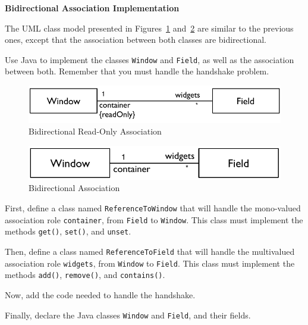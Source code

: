 \documentclass[a4paper,11pt]{memoir}
\newcommand{\code}[1]{\lstinline{#1}}
\begin{document}
\begin{exercise}
	\textbf{Bidirectional Association Implementation}

The UML class model presented in Figures~\ref{fig:readOnly} and~\ref{fig:bidirectional}
are similar to the previous ones, except that the association between both classes are bidirectional.

Use Java to implement the classes \code{Window} and \code{Field}, as well as the association between both.
Remember that you must handle the handshake problem.

\begin{figure}[htbp]
	\centering
		\includegraphics[scale=.8]{CD-WindowFieldReadOnly.pdf}
	\caption{Bidirectional Read-Only Association}
	\label{fig:readOnly}
\end{figure}

\begin{figure}[htbp]
	\centering
		\includegraphics[scale=.8]{CD-WindowField.pdf}
	\caption{Bidirectional Association}
	\label{fig:bidirectional}
\end{figure}	


\begin{inparaenum}[(A)]
	\item First, define a class named \code{ReferenceToWindow} that will handle the mono-valued association role \code{container}, from \code{Field} to \code{Window}. This class must implement the methods \code{get()}, \code{set()}, and \code{unset}.
	\item Then, define a class named \code{ReferenceToField} that will handle the multivalued association role \code{widgets}, from \code{Window} to \code{Field}. This class must implement the methods \code{add()}, \code{remove()}, and \code{contains()}.
	\item Now, add the code needed to handle the handshake. 
	\item Finally, declare the Java classes \code{Window} and \code {Field}, and their fields.
\end{inparaenum}
	
\end{exercise}
\end{document}
